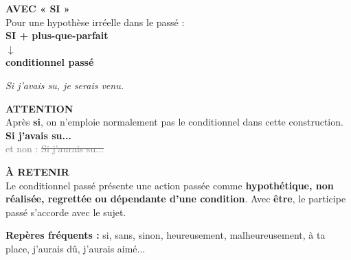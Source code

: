 \documentclass[a4paper,11pt]{article}
\begin{document}
\begin{minipage}{0.91\textwidth}
\vspace{2mm}
\begin{minipage}{0.485\textwidth}
\begin{violetbox}[height=3.25cm]
\textbf{\color{VioletDark}AVEC « SI »}\\[1mm]
Pour une hypothèse irréelle dans le passé :\\[1mm]
\centering
\textbf{SI + plus-que-parfait}\\
$\downarrow$\\
\textbf{conditionnel passé}\\[1mm]
\raggedright
\textit{Si j'avais su, je serais venu.}
\end{violetbox}
\end{minipage}\hfill
\begin{minipage}{0.485\textwidth}
\begin{warnbox}[height=3.25cm]
\textbf{\color{Red}ATTENTION}\\[1mm]
Après \textbf{si}, on n'emploie normalement pas le conditionnel dans cette construction.\\[1mm]
\textbf{Si j'avais su...}\\
\textcolor{Grey}{et non : \sout{Si j'aurais su...}}
\end{warnbox}
\end{minipage}

\vspace{2mm}
\begin{violetbox}
\textbf{\color{VioletDark}À RETENIR}\\[1mm]
Le conditionnel passé présente une action passée comme \textbf{hypothétique, non réalisée,
regrettée ou dépendante d'une condition}. Avec \textbf{être}, le participe passé s'accorde avec le sujet.
\end{violetbox}

\vspace{1.5mm}\centering
{\small\color{Grey}\textbf{Repères fréquents :} si, sans, sinon, heureusement, malheureusement, à ta place, j'aurais dû, j'aurais aimé...}

\end{minipage}
\end{document}
